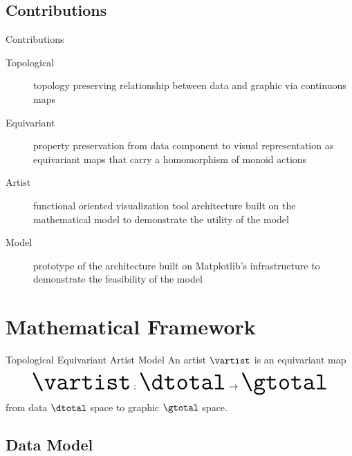 \documentclass[xcolor={dvipsnames}, handout]{beamer}
\begin{document}
\subsection{Contributions}
\begin{frame}{Contributions}
    \begin{description}
        \item[Topological] topology preserving relationship between data and graphic via continuous maps
        \item[Equivariant] property preservation from data component to visual representation as equivariant maps that carry a homomorphism of monoid actions
        \item[Artist] functional oriented visualization tool architecture built on the mathematical model to demonstrate the utility of the model
        \item [Model] prototype of the architecture built on Matplotlib's infrastructure to demonstrate the feasibility of the model
    \end{description}
\end{frame}

\section{Mathematical Framework}

\begin{frame}{Topological Equivariant Artist Model}
    \centering
    An artist $\mathscr{\vartist}$ is an equivariant map 
    \begin{equation}\Huge
        \mathscr{\vartist}: \mathscr{\dtotal} \rightarrow \mathscr{\gtotal}
    \end{equation}
    from data $\mathscr{\dtotal}$ space to graphic $\mathscr{\gtotal}$ space. 

\end{frame}

\subsection{Data Model}
\end{document}
